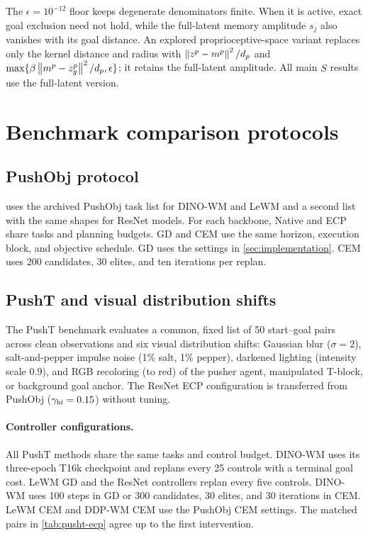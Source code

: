 The $\epsilon=10^{-12}$ floor keeps degenerate denominators finite. When it is active, exact goal exclusion need not hold, while the full-latent memory amplitude $s_j$ also vanishes with its goal distance. An explored proprioceptive-space variant replaces only the kernel distance and radius with $\left\lVert z^p-m^p\right\rVert^2/d_p$ and $\max\{\beta\left\lVert m^p-z_g^p\right\rVert^2/d_p,\epsilon\}$; it retains the full-latent amplitude. All main $S$ results use the full-latent version.

\section{Benchmark comparison protocols}
\label{sec:benchmark}
\subsection{PushObj protocol}
\label{sec:pushobj-comparison}
 uses the archived PushObj task list for DINO-WM and LeWM and a second list with the same shapes for ResNet models. For each backbone, Native and ECP share tasks and planning budgets. GD and CEM use the same horizon, execution block, and objective schedule. GD uses the settings in \cref{sec:implementation}. CEM uses 200 candidates, 30 elites, and ten iterations per replan.

\subsection{PushT and visual distribution shifts}
\label{sec:pusht-extension}
The PushT benchmark evaluates a common, fixed list of 50 start--goal pairs across clean observations and six visual distribution shifts: Gaussian blur ($\sigma=2$), salt-and-pepper impulse noise (1\% salt, 1\% pepper), darkened lighting (intensity scale $0.9$), and RGB recoloring (to red) of the pusher agent, manipulated T-block, or background goal anchor. The ResNet ECP configuration is transferred from PushObj ($\gamma_{\rm hi}=0.15$) without tuning.

\paragraph{Controller configurations.}
All PushT methods share the same tasks and control budget. DINO-WM uses its three-epoch T16k checkpoint and replans every 25 controls with a terminal goal cost. LeWM GD and the ResNet controllers replan every five controls. DINO-WM uses 100 steps in GD or 300 candidates, 30 elites, and 30 iterations in CEM. LeWM CEM and DDP-WM CEM use the PushObj CEM settings. The matched pairs in \cref{tab:pusht-ecp} agree up to the first intervention.

